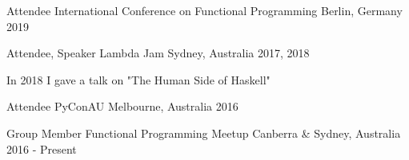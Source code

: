 


\begin{cventries}


\cventry
{Attendee} %
{International Conference on Functional Programming} %
{Berlin, Germany} %
{2019} %
{ %
\begin{cvitems}
\end{cvitems}
}

\vspace{-4.0mm}


\cventry
{Attendee, Speaker} %
{Lambda Jam} %
{Sydney, Australia} %
{2017, 2018} %
{ %
\begin{cvitems}
  \item {In 2018 I gave a talk on "The Human Side of Haskell"}
\end{cvitems}
}




\cventry
{Attendee} %
{PyConAU} %
{Melbourne, Australia} %
{2016} %
{ %
\begin{cvitems}
\end{cvitems}
}

\vspace{-4.0mm}


\cventry
{Group Member} %
{Functional Programming Meetup} %
{Canberra \& Sydney, Australia} %
{2016 - Present} %
{ %
\begin{cvitems}
\end{cvitems}
}


\end{cventries}
